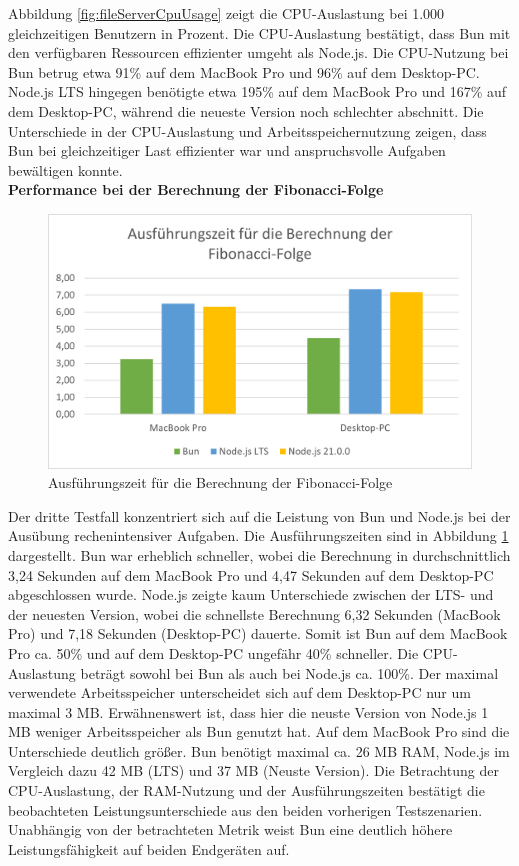 \noindent
Abbildung \ref{fig:fileServerCpuUsage} zeigt die CPU-Auslastung bei 1.000 gleichzeitigen Benutzern in Prozent.  Die CPU-Auslastung bestätigt, dass Bun mit den verfügbaren Ressourcen effizienter umgeht als Node.js. Die CPU-Nutzung bei Bun betrug etwa 91\% auf dem MacBook Pro und 96\% auf dem Desktop-PC. Node.js LTS hingegen benötigte etwa 195\% auf dem MacBook Pro und 167\% auf dem Desktop-PC, während die neueste Version noch schlechter abschnitt. Die Unterschiede in der CPU-Auslastung und Arbeitsspeichernutzung zeigen, dass Bun bei gleichzeitiger Last effizienter war und anspruchsvolle Aufgaben bewältigen konnte.\\

\noindent
\textbf{Performance bei der Berechnung der Fibonacci-Folge}
\begin{figure}[h!]
	\centering
	\includegraphics[width=\linewidth]{./images/fibonacciRuntime.png}
	\caption{Ausführungszeit für die Berechnung der Fibonacci-Folge}
	\label{fig:fibonacciRuntime}
\end{figure}


\noindent
Der dritte Testfall konzentriert sich auf die Leistung von Bun und Node.js bei der Ausübung rechenintensiver Aufgaben. Die Ausführungszeiten sind in Abbildung \ref{fig:fibonacciRuntime} dargestellt. Bun war erheblich schneller, wobei die Berechnung in durchschnittlich 3,24 Sekunden auf dem MacBook Pro und 4,47 Sekunden auf dem Desktop-PC abgeschlossen wurde. Node.js zeigte kaum Unterschiede zwischen der LTS- und der neuesten Version, wobei die schnellste Berechnung 6,32 Sekunden (MacBook Pro) und 7,18 Sekunden (Desktop-PC) dauerte. Somit ist Bun auf dem MacBook Pro ca. 50\% und auf dem Desktop-PC ungefähr 40\% schneller. Die CPU-Auslastung beträgt sowohl bei Bun als auch bei Node.js ca. 100\%. Der maximal verwendete Arbeitsspeicher unterscheidet sich auf dem Desktop-PC nur um maximal 3 MB. Erwähnenswert ist, dass hier die neuste Version von Node.js 1 MB weniger Arbeitsspeicher als Bun genutzt hat. Auf dem MacBook Pro sind die Unterschiede deutlich größer. Bun benötigt maximal ca. 26 MB RAM, Node.js im Vergleich dazu 42 MB (LTS) und 37 MB (Neuste Version).\newline
Die Betrachtung der CPU-Auslastung, der RAM-Nutzung und der Ausführungszeiten bestätigt die beobachteten Leistungsunterschiede aus den beiden vorherigen Testszenarien. Unabhängig von der betrachteten Metrik weist Bun eine deutlich höhere Leistungsfähigkeit auf beiden Endgeräten auf.

